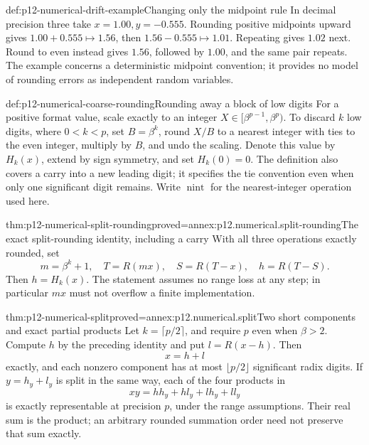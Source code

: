 \begin{hbexample}{def:p12-numerical-drift-example}{Changing only the midpoint rule}
In decimal precision three take \(x=1.00,y=-0.555\).
Rounding positive midpoints upward gives
\(1.00+0.555\mapsto1.56\), then
\(1.56-0.555\mapsto1.01\). Repeating gives \(1.02\) next.
Round to even instead gives \(1.56\), followed by \(1.00\),
and the same pair repeats. The example concerns a deterministic
midpoint convention; it provides no model of rounding errors as
independent random variables.
\end{hbexample}

\begin{hbdefinition}{def:p12-numerical-coarse-rounding}{Rounding away a block of low digits}
For a positive format value, scale exactly to an integer
\(X\in[\beta^{p-1},\beta^p)\). To discard \(k\) low digits,
where \(0<k<p\), set \(B=\beta^k\), round \(X/B\) to a nearest
integer with ties to the even integer, multiply by \(B\), and undo
the scaling. Denote this value by \(H_k(x)\), extend by sign symmetry,
and set \(H_k(0)=0\). The definition also covers a carry into a new
leading digit; it specifies the tie convention even when only one
significant digit remains. Write \(\operatorname{nint}\) for the
nearest-integer operation used here.
\end{hbdefinition}

\begin{hbtheorem}{thm:p12-numerical-split-rounding}{proved=annex:p12.numerical.split-rounding}{The exact split-rounding identity, including a carry}
With all three operations exactly rounded, set
\[
 m=\beta^k+1,\quad T=R(mx),\quad S=R(T-x),\quad h=R(T-S).
\]
Then \(h=H_k(x)\). The statement assumes no range loss at any step;
in particular \(mx\) must not overflow a finite implementation.
\end{hbtheorem}

\begin{hbtheorem}{thm:p12-numerical-split}{proved=annex:p12.numerical.split}{Two short components and exact partial products}
Let \(k=\lceil p/2\rceil\), and require \(p\) even when
\(\beta>2\). Compute \(h\) by the preceding identity and put
\(l=R(x-h)\). Then
\[
 x=h+l
\]
exactly, and each nonzero component has at most \(\lfloor p/2\rfloor\)
significant radix digits. If \(y=h_y+l_y\) is split in the same way,
each of the four products in
\[
 xy=h h_y+h l_y+l h_y+l l_y
\]
is exactly representable at precision \(p\), under the range assumptions.
Their real sum is the product; an arbitrary rounded summation order
need not preserve that sum exactly.
\end{hbtheorem}

